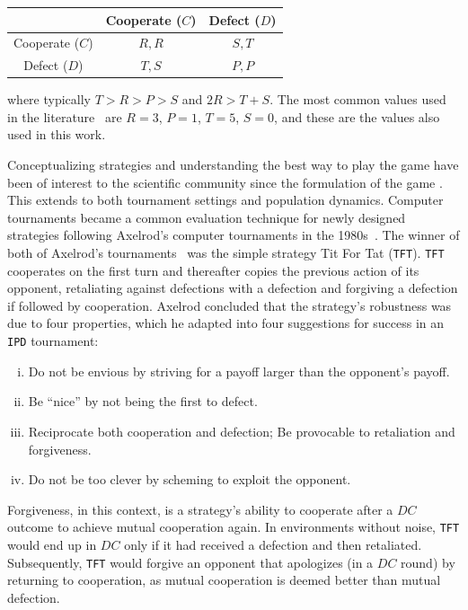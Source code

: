 \documentclass{article}
\def\TFT{\texttt{TFT}}
\def\IPD{\texttt{IPD}}
\begin{document}
\begin{center}
{\renewcommand{\arraystretch}{2}%
\begin{tabular}{c|c|c}
& Cooperate (\(C\)) & Defect (\(D\)) \\
\hline
Cooperate (\(C\)) & \(R, R\) & \(S, T\) \\
\hline
Defect (\(D\)) & \(T, S\) & \(P, P\) \\
\end{tabular}}
\end{center}

where typically \(T > R > P > S\) and \(2R > T + S\). The most common values
used in the literature~\cite{Axelrod1981} are \(R=3\), \(P=1\), \(T=5\),
\(S=0\), and these are the values also used in this work.



Conceptualizing strategies and understanding the best way to play the game have
been of interest to the scientific community since the formulation of the game
\cite{Axelrod1980a, Nowak1992, Nowak1993, Beaufils1997, Press2012, Tzafestas2000, Hilbe2017,
Glynatsi2020, Murase2021, Schmid2022, Li2022, Chen2023}.
This extends to both tournament settings and population dynamics.
Computer tournaments became a common evaluation technique for newly designed
strategies following Axelrod's computer tournaments in the
1980s~\cite{Axelrod1980a, Axelrod1980b}.
The winner of both of Axelrod's tournaments~\cite{Axelrod1980a, Axelrod1980b}
was the simple strategy Tit For Tat (\TFT{}). \TFT{} cooperates on the first turn
and thereafter copies the previous action of its opponent, retaliating against
defections with a defection and forgiving a defection if followed by
cooperation. Axelrod concluded that the strategy's robustness was due to four
properties, which he adapted into four suggestions for success in an \IPD{}
tournament:

\begin{enumerate}[(i)]
    \item Do not be envious by striving for a payoff larger than the opponent's payoff.
    \item Be ``nice'' by not being the first to defect.
    \item Reciprocate both cooperation and defection; Be provocable to retaliation and forgiveness.
    \item Do not be too clever by scheming to exploit the opponent.
\end{enumerate}

Forgiveness, in this context, is a strategy's ability to cooperate after a
\(DC\) outcome to achieve mutual cooperation again. In environments without
noise, \TFT{} would end up in \(DC\) only if it had received a defection and
then retaliated. Subsequently, \TFT{} would forgive an opponent that apologizes
(in a \(DC\) round) by returning to cooperation, as mutual cooperation is deemed
better than mutual defection.
\end{document}
